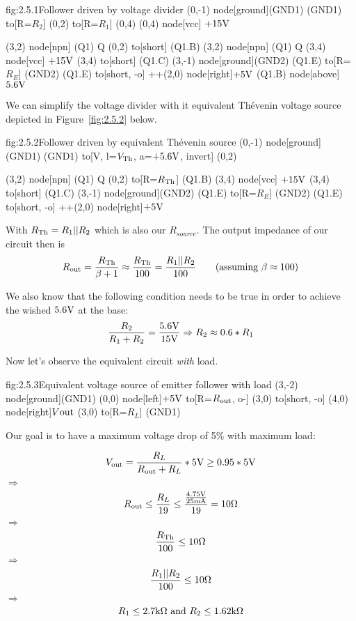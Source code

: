 \documentclass[../main.tex]{subfiles}
\begin{document}
	
	\begin{schematic}{fig:2.5.1}{Follower driven by voltage divider}
		(0,-1) node[ground](GND1){}
		(GND1) to[R=$R_2$] (0,2)
		to[R=$R_1$] (0,4)
		(0,4) node[vcc] {$+15\text{V}$}
		
		(3,2) node[npn] (Q1) {Q}
		(0,2) to[short] (Q1.B)
		(3,2) node[npn] (Q1) {Q}
		(3,4) node[vcc] {$+15\text{V}$}
		(3,4) to[short] (Q1.C)
		(3,-1) node[ground](GND2){}
		(Q1.E) to[R=$R_E$] (GND2)
		(Q1.E) to[short, -o] ++(2,0) node[right]{$+5\text{V}$}
		(Q1.B) node[above]{$5.6\text{V}$}
	\end{schematic}
	
	We can simplify the voltage divider with it equivalent Th\'evenin voltage source depicted in Figure~\ref{fig:2.5.2} below.
	
	\begin{schematic}{fig:2.5.2}{Follower driven by equivalent Th\'evenin source}
		(0,-1) node[ground](GND1){}
		(GND1) to[V, l=$V_{\text{Th}}$, a={$+5.6\text{V}$}, invert] (0,2) 
       
		(3,2) node[npn] (Q1) {Q}
		(0,2) to[R=$R_{\text{Th}}$] (Q1.B)
		(3,4) node[vcc] {$+15\text{V}$}
		(3,4) to[short] (Q1.C)
		(3,-1) node[ground](GND2){}
		(Q1.E) to[R=$R_E$] (GND2)
		(Q1.E) to[short, -o] ++(2,0) node[right]{$+5\text{V}$}
	\end{schematic}
	
	With $R_{\text{Th}} = R_1||R_2$ which is also our $R_{source}$. The output impedance of our circuit then is  
	\[R_{\text{out}}=\frac{R_{\text{Th}}}{\beta + 1} \approx \frac{R_{\text{Th}}}{100} = \frac{R_1||R_2}{100}\qquad(\text{assuming}~\beta \approx 100)\]
	 
	We also know that the following condition needs to be true in order to achieve the wished $5.6\text{V}$ at the base: 
	\[\frac{R_2}{R_1 + R_2} = \frac{5.6\text{V}}{15\text{V}} \Rightarrow R_2 \approx 0.6 * R_1\]
	
	Now let's observe the equivalent circuit \emph{with} load.
	
	\begin{schematic}{fig:2.5.3}{Equivalent voltage source of emitter follower with load}
		(3,-2) node[ground](GND1){}
		(0,0) node[left]{$+5\text{V}$}
		to[R=$R_{\text{out}}$, o-] (3,0)
		to[short, -o] (4,0) node[right]{$V\text{out}$}
		(3,0) to[R=$R_L$] (GND1)
	\end{schematic}
	
	Our goal is to have a maximum voltage drop of 5\% with maximum load:
	
	\[V_{\text{out}} = \frac{R_L}{R_{\text{out}} + R_L} * 5\text{V} \geq 0.95 * 5\text{V}\]
	$\Rightarrow$
	\[R_{\text{out}} \leq \frac{R_L}{19} \leq \frac{\frac{4.75\text{V}}{25\text{m}\text{A}}}{19} = 10\Omega\]
	$\Rightarrow$
	\[\frac{R_{\text{Th}}}{100} \leq 10\Omega\]
	$\Rightarrow$
	\[\frac{R_1||R_2}{100} \leq 10\Omega\]
	$\Rightarrow$
	\[R_1 \leq 2.7\text{k}\Omega~\text{and}~R_2 \leq 1.62\text{k}\Omega\]
	
\end{document}

